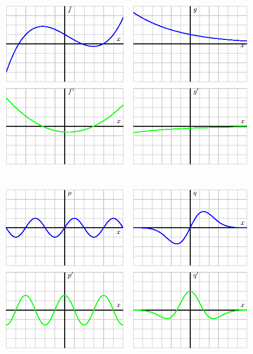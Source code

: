 \begin{activitySolution}
\begin{center}
\includegraphics{figures/1_4_Act1aSoln.eps} \\
\underline{\hspace{4in}}\\
\ \\
\includegraphics{figures/1_4_Act1bSoln.eps}
\end{center}


\end{activitySolution}
